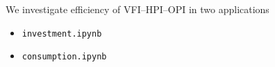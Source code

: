 \begin{frame}
    
    We investigate efficiency of VFI--HPI--OPI in two applications 

    \vspace{0.5em}
    \begin{itemize}
        \item \texttt{investment.ipynb}
    \vspace{0.5em}
        \item \texttt{consumption.ipynb}
    \end{itemize}

\end{frame}













